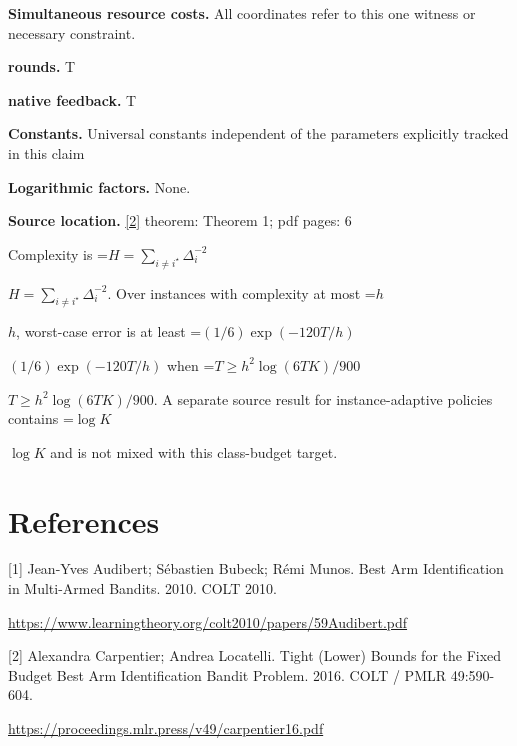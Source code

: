 \documentclass[10pt,a4paper]{article}
\newcommand{\AtlasMath}[1]{\par\begingroup\centering\setbox0=\hbox{$\displaystyle #1$}\ifdim\wd0>1.4\linewidth\typeout{ATLAS WIDE FORMULA: \the\wd0}\fi\ifdim\wd0>\linewidth\resizebox{\linewidth}{!}{\box0}\else\box0\fi\par\endgroup}
\newcommand{\AtlasInlineMath}[1]{\begingroup\setbox0=\hbox{$#1$}\ifdim\wd0>.4\linewidth\endgroup\AtlasMath{#1}\else\endgroup$#1$\fi}
\begin{document}
\textbf{Simultaneous resource costs.} All coordinates refer to this one witness or necessary constraint.

\textbf{rounds.} T

\textbf{native feedback.} T

\textbf{Constants.} Universal constants independent of the parameters explicitly tracked in this claim

\textbf{Logarithmic factors.} None.

\textbf{Source location.} \href{https://proceedings.mlr.press/v49/carpentier16.pdf}{[2]} theorem: Theorem 1; pdf pages: 6

Complexity is \AtlasInlineMath{H=\sum_{i\ne i^\star}\Delta_i^{-2}}. Over instances with complexity at most \AtlasInlineMath{h}, worst-case error is at least \AtlasInlineMath{(1/6)\exp(-120T/h)} when \AtlasInlineMath{T\ge h^2\log(6TK)/900}. A separate source result for instance-adaptive policies contains \AtlasInlineMath{\log K} and is not mixed with this class-budget target.

\section{References}
[1] Jean-Yves Audibert; Sébastien Bubeck; Rémi Munos. Best Arm Identification in Multi-Armed Bandits. 2010. COLT 2010.

\url{https://www.learningtheory.org/colt2010/papers/59Audibert.pdf}

[2] Alexandra Carpentier; Andrea Locatelli. Tight (Lower) Bounds for the Fixed Budget Best Arm Identification Bandit Problem. 2016. COLT / PMLR 49:590-604.

\url{https://proceedings.mlr.press/v49/carpentier16.pdf}
\end{document}
